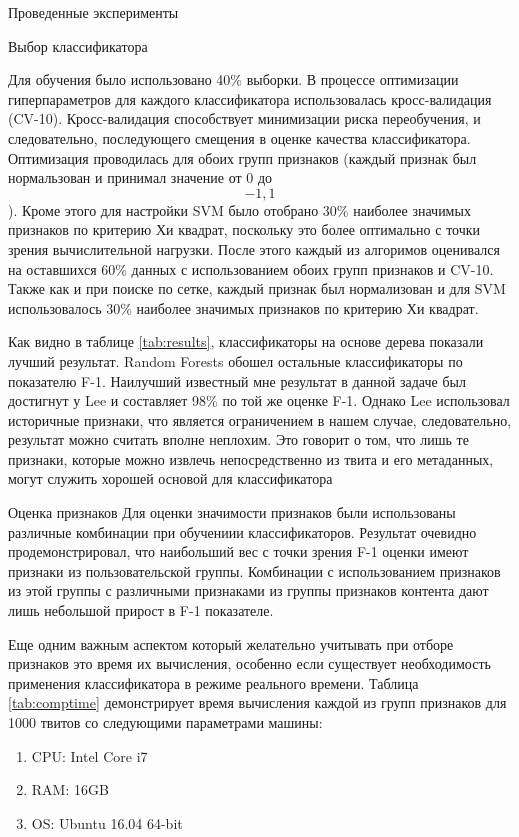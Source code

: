 \begin{section}{Проведенные эксперименты}
\begin{subsection}{Выбор классификатора}
\begin{table}[H]
\caption{Время вычисления признаков}
\label{tab:comptime}
\end{table}



\end{subsection}


Для обучения было использовано 40\% выборки. В процессе оптимизации гиперпараметров для каждого классификатора использовалась кросс-валидация (CV-10). Кросс-валидация способствует минимизации риска  переобучения, и следовательно, последующего смещения в оценке качества классификатора. Оптимизация проводилась для обоих групп признаков (каждый признак был нормальзован и принимал значение от 0 до \[-1, 1\]). Кроме этого для настройки SVM было отобрано 30\% наиболее значимых признаков по критерию Хи квадрат, поскольку это более оптимально с точки зрения вычислительной нагрузки. После этого  каждый из алгоримов оценивался на оставшихся 60\% данных с использованием обоих групп признаков и CV-10. Также как и при поиске по сетке, каждый признак был нормализован  и для SVM использовалось 30\% наиболее значимых признаков по критерию Хи квадрат.

Как видно в таблице \ref{tab:results}, классификаторы на основе дерева показали лучший результат. Random Forests обошел остальные классификаторы по показателю F-1. Наилучший известный мне результат в данной задаче был достигнут у Lee \cite{Lee} и составляет 98\% по той же оценке F-1. Однако Lee использовал историчные признаки, что является ограничением в нашем случае, следовательно, результат можно считать вполне неплохим. Это говорит о том, что лишь те признаки, которые можно извлечь непосредственно из твита и его метаданных,  могут служить хорошей основой для классификатора

\begin{subsection}{Оценка признаков}
Для оценки значимости признаков были  использованы различные комбинации  при обучениии классификаторов. Результат очевидно продемонстрировал, что наибольший вес с точки зрения F-1 оценки имеют признаки из пользовательской группы. Комбинации с использованием признаков из этой группы с различными признаками из группы признаков контента дают лишь небольшой прирост в F-1 показателе. 

Еще одним важным аспектом который желательно учитывать при отборе признаков это время их вычисления, особенно если существует необходимость применения классификатора в режиме реального времени. Таблица \ref{tab:comptime} демонстрирует время вычисления каждой из групп признаков для 1000 твитов со следующими параметрами машины:
\begin{enumerate}
\item CPU: Intel Core i7
\item RAM: 16GB
\item OS: Ubuntu 16.04 64-bit
\end{enumerate}


\end{subsection}
\end{section}
